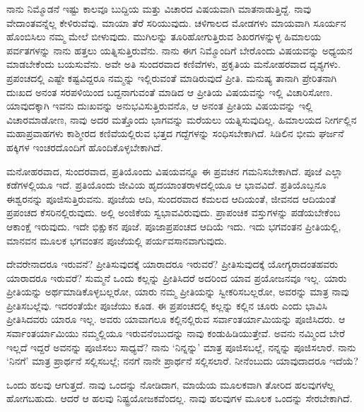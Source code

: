 ನಾನು ನಿಮ್ಮೊಡನೆ ಇಷ್ಟು ಕಾಲವೂ ಬುದ್ದಿಯ ಮತ್ತು ವಿಚಾರದ ವಿಷಯವಾಗಿ ಮಾತನಾಡುತ್ತಿದ್ದೆ. ನಾವು ವೇದಾಂತವನ್ನೆಲ್ಲ ಕೇಳಿರುವೆವು. ಮಾಯಾ ತೆರೆ ಸರಿಯುವುದು. ಚಳಿಗಾಲದ ಮೋಡಗಳು ಮಾಯವಾಗಿ ಸೂರ್ಯನ ಹೊಂಬಿಸಿಲು ನಮ್ಮ ಮೇಲೆ ಬೀಳುವುದು. ಮುಗಿಲನ್ನು ತೂರಿಹೋಗುತ್ತಿರುವ ಶಿಖರಗಳನ್ನುಳ್ಳ ಹಿಮಾಲಯ ಪರ್ವತಗಳನ್ನು ನಾನು ಹತ್ತಲು ಯತ್ನಿಸುತ್ತಿರುವೆನು. ನಾನು ಈಗ ನಿಮ್ಮೊಂದಿಗೆ ಬೇರೊಂದು ವಿಷಯವನ್ನು ಅಧ್ಯಯನ ಮಾಡಬೇಕೆಂದು ಬಯಸುವೆನು. ಅವೇ ಅತಿ ಸುಂದರವಾದ ಕಣಿವೆಗಳು, ಪ್ರಕೃತಿಯ ಮನೋಹರವಾದ ದೃಶ್ಯಗಳು. ಪ್ರಪಂಚದಲ್ಲಿ ಎಷ್ಟೇ ಕಷ್ಟವಿದ್ದರೂ ನಮ್ಮನ್ನು ಇಲ್ಲಿರುವಂತೆ ಮಾಡಿರುವುದೆ ಪ್ರೀತಿ. ಮನುಷ್ಯ ತಾನಾಗಿ ಪ್ರೇರಿತನಾಗಿ ದುಃಖದ ಅನಂತ ಸರಪಳಿಯಿಂದ ಬದ್ದನಾಗುವಂತೆ ಮಾಡಿದ ಆ ಪ್ರೀತಿಯ ವಿಷಯವನ್ನು ಇಲ್ಲಿ ವಿಚಾರಿಸೋಣ. ಯಾವುದಕ್ಕಾಗಿ ಇವನು ದುಃಖವನ್ನು ಅನುಭವಿಸುತ್ತಿರುವನೊ, ಆ ಅನಂತ ಪ್ರೀತಿಯ ವಿಷಯವನ್ನು ಇಲ್ಲಿ ವಿಚಾರಮಾಡೋಣ, ನಾವು ಅದರ ಮತ್ತೊಂದು ಭಾಗವನ್ನು ಮರೆಯಲು ಯತ್ನಿಸುವುದಿಲ್ಲ. ಹಿಮಾಲಯದ ನೀರ್ಗಲ್ಲಿನ ಮಹಾಪ್ರವಾಹಗಳು ಕಾಶ್ಮೀರದ ಕಣಿವೆಯಲ್ಲಿರುವ ಭತ್ತದ ಗದ್ದೆಗಳನ್ನು ಸಂಧಿಸಬೇಕಾಗಿದೆ. ಸಿಡಿಲಿನ ಭೀಮ ಘರ್ಜನೆ ಹಕ್ಕಿಗಳ ಇಂಚರದೊಂದಿಗೆ ಹೊಂದಿಕೊಳ್ಳಬೇಕಾಗಿದೆ.

ಮನೋಹರವಾದ, ಸುಂದರವಾದ, ಪ್ರತಿಯೊಂದು ವಿಷಯವನ್ನೂ ಈ ಪ್ರವಚನ ಗಮನಿಸಬೇಕಾಗಿದೆ. ಪೂಜೆ ಎಲ್ಲಾ ಕಡೆಗಳಲ್ಲಿಯೂ ಇದೆ. ಪ್ರತಿಯೊಂದು ಜೀವಿಯ ಹೃದಯಾಂತರಾಳದಲ್ಲಿಯೂ ಆ ಭಾವವಿದೆ. ಪ್ರತಿಯೊಬ್ಬನೂ ಈಶ್ವರನನ್ನು ಪೂಜಿಸುತ್ತಿರುವನು. ಪೂಜೆಯ ಆದಿ, ಸುಂದರವಾದ ಕಮಲದ ಆದಿಯಂತೆ, ಜೀವನದ ಆದಿಯಂತೆ ಪ್ರಪಂಚದ ಕೆಸರಿನಲ್ಲಿರುವುದು. ಅಲ್ಲಿ ಅಂಜಿಕೆಯ ಸ್ವಭಾವವಿರುವುದು. ಪ್ರಾಪಂಚಿಕ ವಸ್ತುಗಳನ್ನು ಪಡೆಯಬೇಕೆಂಬ ಆಕಾಂಕ್ಷೆ ಇರುವುದು. ಇದೇ ಭಿಕ್ಷುಕನ ಪೂಜೆ. ಪೂಜಾಪ್ರಪಂಚದ ಆದಿಯೆ ಇದು. ಇದು ಭಗವಂತನ ಪ್ರೀತಿಯಲ್ಲಿ, ಮಾನವನ ಮೂಲಕ ಭಗವಂತನ ಪೂಜೆಯಲ್ಲಿ ಪರ್ಯವಸಾನವಾಗುವುದು.

ದೇವರೇನಾದರೂ ಇರುವನೆ? ಪ್ರೀತಿಸುವುದಕ್ಕೆ ಯಾರಾದರೂ ಇರುವರೆ? ಪ್ರೀತಿಸುವುದಕ್ಕೆ ಯೋಗ್ಯರಾದಂತಹವರು ಯಾರಾದರೂ ಇರುವರೆ? ಸುಮ್ಮನೆ ಒಂದು ಕಲ್ಲನ್ನು ಪ್ರೀತಿಸಿದರೆ ಅದರಿಂದ ಯಾವ ಪ್ರಯೋಜನವೂ ಇಲ್ಲ. ಯಾರು ಪ್ರೀತಿಯನ್ನು ಅರ್ಥಮಾಡಿಕೊಳ್ಳಬಲ್ಲರೋ, ಯಾರು ನಮ್ಮ ಪ್ರೀತಿಯನ್ನು ಸ್ವೀಕರಿಸಬಲ್ಲರೋ, ಅವರನ್ನು ಮಾತ್ರ ನಾವು ಪ್ರೀತಿಸಬಲ್ಲೆವು. ಇದರಂತೆಯೇ ಪೂಜೆಯು ಕೂಡ. ಈ ಪ್ರಪಂಚದಲ್ಲಿ ಕಲ್ಲನ್ನು ಕಲ್ಲಿನ ಚೂರು ಎಂದು ಭಾವಿಸಿ ಪ್ರೀತಿಸಿದವರು ಯಾರೂ ಇಲ್ಲ. ಅವರು ಯಾವಾಗಲೂ ಕಲ್ಲಿನಲ್ಲಿರುವ ಸರ್ವಾಂತರ್ಯಾಮಿಯನ್ನು ಪೂಜಿಸಿದರು. ಆ ಸರ್ವಾಂತರ್ಯಾಮಿಯು ನಮ್ಮಲ್ಲಿಯೂ ಇರುವನೆಂಬುದನ್ನು ನಾವು ಕಂಡುಹಿಡಿಯುತ್ತೇವೆ. ಅವನು ನಮ್ಮಿಂದ ಬೇರೆ ಇಲ್ಲದೆ ಇದ್ದರೆ ಅವನನ್ನು ಪೂಜಿಸಲು ಸಾಧ್ಯವೆ? ನಾನು `ನಿನ್ನನ್ನು' ಮಾತ್ರ ಪೂಜಿಸಬಲ್ಲೆ, ನನ್ನನ್ನು ಪೂಜಿಸಲಾರೆ. ನಾನು `ನಿನಗೆ' ಮಾತ್ರ ಪ್ರಾರ್ಥನೆ ಸಲ್ಲಿಸಬಲ್ಲೆ; ನನಗೆ ನಾನೇ ಪ್ರಾರ್ಥನೆ ಸಲ್ಲಿಸಲಾರೆ. ನೀನೆಂಬುದು ಯಾವುದಾದರೂ ಇದೆಯೆ?

ಒಂದು ಹಲವು ಆಗುತ್ತದೆ. ನಾವು ಒಂದನ್ನು ನೋಡಿದಾಗ, ಮಾಯೆಯ ಮೂಲಕವಾಗಿ ತೋರಿದ ಹಲವುಗಳೆಲ್ಲ ಹೋಗಬಹುದು. ಆದರೆ ಆ ಹಲವು ನಿಷ್ಟ್ರಯೋಜಕವೆಂದಲ್ಲ. ನಾವು ಹಲವುಗಳ ಮೂಲಕ ಒಂದನ್ನು ಸೇರಬೇಕಾಗಿದೆ.

